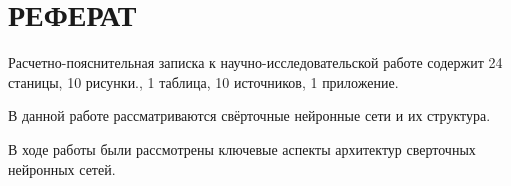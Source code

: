 \chapter*{РЕФЕРАТ}

Расчетно-пояснительная записка к научно-исследовательской работе содержит 24 станицы, 10 рисунки., 1 таблица, 10 источников, 1 приложение.

В данной работе рассматриваются свёрточные нейронные сети и их структура.

В ходе работы были рассмотрены ключевые аспекты архитектур сверточных нейронных сетей.

\setcounter{page}{3}